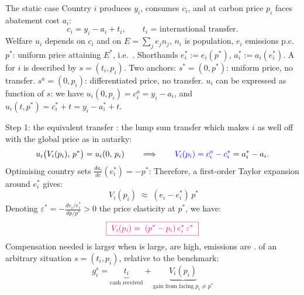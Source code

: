 \documentclass[aspectratio=169,xcolor=dvipsnames, 11pt,mathserif]{beamer}
\newcommand{\eed}{\ee\vspace{-\dimexpr 2\topsep+\parskip+\medskipamount-3pt\relax}}
\begin{document}
\begin{frame}{The static case\label{static_setting}}
\bbvsp
\ip %
Country $i$ produces $y_i$, consumes $c_i$, and at carbon price $p_i$ faces abatement cost $a_i$:
\[ c_i = y_i - a_i + t_i, \qquad t_i \text{ = international transfer}. \]
\ee
\bbvsp
\ip Welfare $u_i$ depends on $c_i$ and on  $E=\sum_j e_j n_j$,  
\bbvs \ip $n_i$ is population, $e_i$ emissions p.c. \ee
\ip $p^*$: uniform price attaining $E^*$, i.e.\ . \bbvs \ip Shorthands $e_i^*:=e_i(p^*)$, $a_i^*:=a_i(e_i^*)$. \ee
\ip A  for $i$ is described by $s=(t_i,p_i)$. Two anchors:
  \bbvsp
  \ip {} $s^*=(0,p^*)$: uniform price, no transfer. %
  \ip {} $s^a=(0,p_i)$: differentiated price, no transfer.
  \ee
\ip $u_i$ can be expressed as function of $s$: we have $u_i(0,p_i)=c^a_i=y_i - a_i$, and $u_i(t,p^*) = c_i^* + t = y_i - a_i^* + t$.
\ee
\end{frame}


\begin{frame}{Step 1: the equivalent transfer\label{equivalent_variation}}
\small
\bbvsp
\ip {}: the lump sum transfer which makes $i$ as well off with the global price as in autarky:
\[ u_i\bigl(V_i(p_i),\,p^*\bigr) = u_i(0,\,p_i) \qquad\Longrightarrow\qquad \textcolor{blue}{V_i(p_i) = c_i^a - c_i^*} = a_i^* - a_i. \]
\eed
\bbvsp 
\ip Optimising country sets $\frac{da_i}{de}(e_i^*)=-p^*$: Therefore, a first-order Taylor expansion around $e_i^*$ gives:
\[ \;V_i(p_i) \;\approx\; (e_i-e_i^*)\,p^* \]
\eed
\bbvsp
\ip Denoting $\varepsilon^*=-\tfrac{de_i/e_i^*}{dp/p^*} > 0$ the price elasticity at $p^*$, we have:
\[ \textcolor{magenta}{\boxed{\;V_i(p_i)=\; (p^*-p_i)\,e_i^*\,\varepsilon^*\;}}\]
\eed
\bbvsp
\ip Compensation needed is larger when  is large,  are high, emissions are .
\ip {} of an arbitrary situation $s=(t_i,p_i)$, relative to the benchmark:
\[ g_i^s = \underbrace{t_i}_{\text{cash received}} + \underbrace{V_i(p_i)}_{\text{gain from facing } p_i \neq p^*} \]
\ee
\end{frame}
\end{document}
